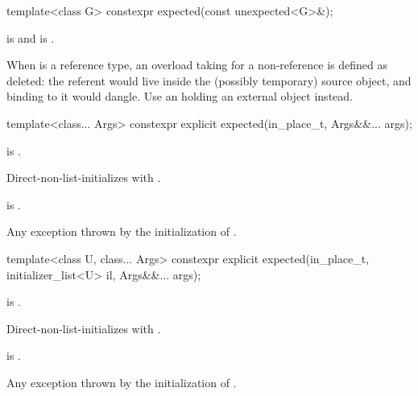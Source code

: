 %
\begin{itemdecl}
template<class G> constexpr expected(const unexpected<G>&);
\end{itemdecl}

\begin{itemdescr}
\pnum
\constraints
{} is  and  is .

\pnum
\remarks
When  is a reference type, an overload taking  for a non-reference  is defined as deleted: the referent would live inside the (possibly temporary) source  object, and binding  to it would dangle. Use an  holding an external object instead.
\end{itemdescr}

%
\begin{itemdecl}
template<class... Args> constexpr explicit expected(in_place_t, Args&&... args);
\end{itemdecl}

\begin{itemdescr}
\pnum
\constraints
{} is .

\pnum
\effects
Direct-non-list-initializes  with .

\pnum
\ensures
{} is .

\pnum
\throws
Any exception thrown by the initialization of .
\end{itemdescr}

%
\begin{itemdecl}
template<class U, class... Args>
constexpr explicit expected(in_place_t, initializer_list<U> il, Args&&... args);
\end{itemdecl}

\begin{itemdescr}
\pnum
\constraints
{} is .

\pnum
\effects
Direct-non-list-initializes  with .

\pnum
\ensures
{} is .

\pnum
\throws
Any exception thrown by the initialization of .
\end{itemdescr}

